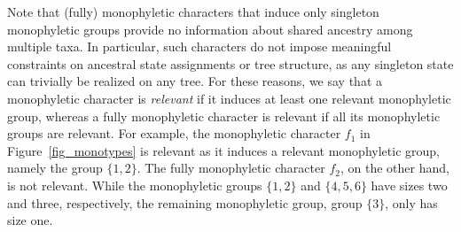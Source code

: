 \documentclass{amsart}
\theoremstyle{definition}
\begin{document}
Note that (fully) monophyletic characters that induce only singleton monophyletic groups provide no information about shared ancestry among multiple taxa. In particular, such characters do not impose meaningful constraints on ancestral state assignments or tree structure, as any singleton state can trivially be realized on any tree.
For these reasons, we say that a monophyletic character is \emph{relevant} if it induces at least one relevant monophyletic group, whereas a fully monophyletic character is relevant if all its monophyletic groups are relevant.
For example, the monophyletic character $f_1$ in Figure~\ref{fig_monotypes} is relevant as it induces a relevant monophyletic group, namely the group $\{1,2\}$. The fully monophyletic character $f_2$, on the other hand, is not relevant. While the monophyletic groups $\{1,2\}$ and $\{4,5,6\}$ have sizes two and three, respectively, the remaining monophyletic group, group $\{3\}$, only has size one.
\end{document}
